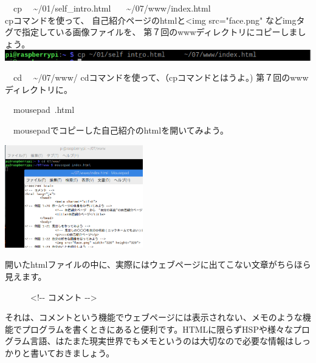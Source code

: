 \documentclass[a4paper,12pt,dvipdfmx]{jarticle}
\begin{document}
\begin{minipage}[b]{0.5\textwidth}
	\begin{enumerate}
		\begin{minipage}[b]{1.5\textwidth}
			\item \ \ cp \ \ {\textasciitilde}/01/self\_intro.html \ \ \ {\textasciitilde}/07/www/index.html\\
			cpコマンドを使って、 自己紹介ページのhtmlと<img src="face.png" などimgタグで指定している画像ファイルを、 第７回のwwwディレクトリにコピーしましょう。\\
			\includegraphics[width=14.73cm]{ome7-img033.png}
		\end{minipage}

		\bigskip

		\item

		      \ \ cd \ \ {\textasciitilde}/07/www/\newline
		      cdコマンドを使って、（cpコマンドとはうよ。) 第７回のwwwディレクトリに。


		\item \ \ mousepad\ \index.html

		      \ \ mousepadでコピーした自己紹介のhtmlを開いてみよう。

	\end{enumerate}
\end{minipage}
\includegraphics[width=0.45\textwidth]{ome7-img034.png}

\bigskip

開いたhtmlファイルの中に、実際にはウェブページに出てこない文章がちらほら見えます。

\ \ \ \ \ \ {\textless}!-{}- コメント -{}-{\textgreater}

それは、コメントという機能でウェブページには表示されない、メモのような機能でプログラムを書くときにあると便利です。HTMLに限らずHSPや様々なプログラム言語、はたまた現実世界でもメモというのは大切なので必要な情報はしっかりと書いておきましょう。
\end{document}
